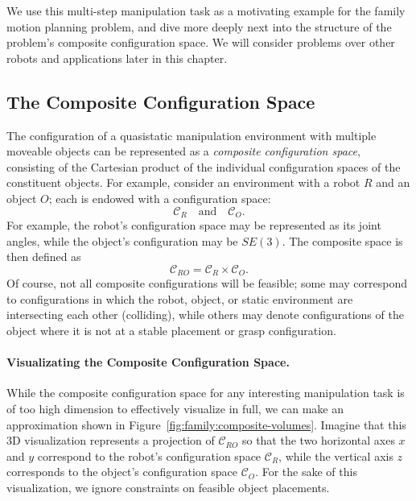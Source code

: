 We use this multi-step manipulation task as a motivating example
for the family motion planning problem,
and dive more deeply next into the structure of the problem's
composite configuration space.
We will consider problems over other robots and applications
later in this chapter.

\subsection{The Composite Configuration Space}

The configuration of a quasistatic manipulation environment
with multiple moveable objects can be represented as a
\emph{composite configuration space},
consisting of the Cartesian product of the individual configuration
spaces of the constituent objects.
For example,
consider an environment with a robot $R$ and an object $O$;
each is endowed with a configuration space:
\begin{equation}
   \mathcal{C}_R \quad\mbox{and}\quad \mathcal{C}_O.
\end{equation}
For example,
the robot's configuration space may be represented as its joint angles,
while the object's configuration may be $SE(3)$.
The composite space is then defined as
\begin{equation}
   \mathcal{C}_{RO} = \mathcal{C}_R \times \mathcal{C}_O.
\end{equation}
Of course,
not all composite configurations will be feasible;
some may correspond to configurations in which the robot,
object, or static environment are intersecting each other (colliding),
while others may denote configurations of the object where it is
not at a stable placement or grasp configuration.

\paragraph{Visualizating the Composite Configuration Space.}
While the composite configuration space for any interesting
manipulation task
is of too high dimension to effectively visualize in full,
we can make an approximation shown
in Figure~\ref{fig:family:composite-volumes}.
Imagine that this 3D visualization represents a projection of
$\mathcal{C}_{RO}$
so that the two horizontal axes $x$ and $y$ correspond to
the robot's configuration space $\mathcal{C}_{R}$,
while the vertical axis $z$ corresponds to the object's
configuration space $\mathcal{C}_{O}$.
For the sake of this visualization,
we ignore constraints on feasible object placements.

